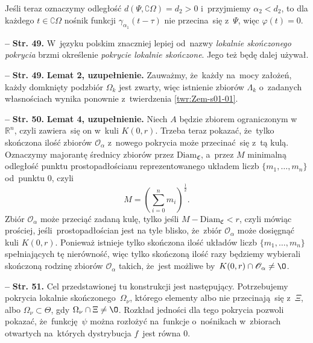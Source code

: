 \documentclass[a4paper,11pt]{article}
\newcommand{\spaceThree}{0.5em}
\newcommand{\ld}{\ldots}
\newcommand{\fr}{\frac}
\newcommand{\mr}{\mathrm}
\newcommand{\mb}{\mathbb}
\newcommand{\mc}{\mathcal}
\newcommand{\mf}{\mathfrak}
\newcommand{\al}{\alpha}
\newcommand{\ga}{\gamma}
\newcommand{\La}{\Lambda}
\newcommand{\vp}{\varphi}
\newcommand{\Om}{\Omega}
\newcommand{\R}{\mb{R}}
\newcommand{\Rn}{\R^{ n }}
\newcommand{\Oc}{\mc{O}}
\newcommand{\subs}{\subset}
\newcommand{\com}{\complement}
\newcommand{\Sum}{\sum\limits}
\newcommand{\tb}{\textbf}
\newcommand{\noi}{\noindent}
\newcommand{\start}{\noi \tb{--} {}}
\newcommand{\Str}[1]{\tb{Str. #1.}}
\newcommand{\vpt}{\vp( t )}
\begin{document}
Jeśli teraz oznaczymy odległość $d( \Psi, \com \Om ) = d_{ 2 } > 0$
i~przyjmiemy $\al_{ 2 } < d_{ 2 }$, to dla każdego $t \in \com \Om$
nośnik funkcji $\ga_{ \al_{ 1 } }( t - \tau )$ nie przecina~się
z~$\Psi$, więc $\vpt = 0$.

\vspace{\spaceThree}


\start \Str{49} W~języku polskim znaczniej lepiej od~nazwy
\emph{lokalnie skończonego pokrycia} brzmi określenie \emph{pokrycie
  lokalnie skończone}. Jego też będę dalej używał.

\vspace{\spaceThree}


\start \Str{49} \tb{Lemat 2, uzupełnienie.} Zauważmy, że~każdy na~mocy
założeń, każdy domknięty podzbiór $\Om_{ k }$ jest zwarty, więc
istnienie zbiorów $\La_{ k }$ o~zadanych własnościach wynika ponownie
z~twierdzenia \eqref{twr:Zem-s01-01}.

\vspace{\spaceThree}


\start \Str{50} \tb{Lemat 4, uzupełnienie.} Niech $A$ będzie zbiorem
ograniczonym w~$\Rn$, czyli zawiera~się on w~kuli $K( 0, r )$. Trzeba
teraz pokazać, że~tylko skończona ilość zbiorów $\Oc_{ \al }$ z~nowego
pokrycia może przecinać~się z~tą kulą. Oznaczymy majorantę średnicy
zbiorów przez $\mr{Diam}_{ \mf{ C } }$, a~przez $M$ minimalną
odległość punktu prostopadłościanu reprezentowanego układem liczb
$\{ m_{ 1 }, \ld, m_{ n } \}$ od~punktu $0$, czyli
\begin{equation*}
  M = \left( \Sum_{ i = 0 }^{ n } m_{ i } \right)^{ \fr{ 1 }{ 2 } }.
\end{equation*}
Zbiór $\Oc_{ \al }$ może przeciąć zadaną kulę, tylko jeśli
$M - \mr{Diam}_{ \mf{C} } < r$, czyli mówiąc prościej,
jeśli~prostopadłościan jest na tyle blisko, że~zbiór $\Oc_{ \al }$
może dosięgnąć kuli $K( 0, r )$. Ponieważ istnieje tylko skończona
ilość układów liczb $\{ m_{ 1 }, \ld, m_{ n } \}$ spełniających tę
nierówność, więc tylko skończoną ilość razy będziemy wybierali
skończoną rodzinę zbiorów $\Oc_{ \al }$ takich, że~jest możliwe
by~$K( 0, r ) \cap \Oc_{ \al } \neq \O$.

\vspace{\spaceThree}


\start \Str{51} Cel przedstawionej tu konstrukcji jest następujący.
Potrzebujemy pokrycia lokalnie skończonego~$\Om_{ \nu }$, którego
elementy albo nie przecinają~się z~$\Xi$, albo
$\Om_{ \nu } \subs \Theta$, gdy $\Om_{ \nu } \cap \Xi \neq \O$.
Rozkład jedności dla tego pokrycia pozwoli pokazać, że~funkcję~$\psi$
można rozłożyć na~funkcje o~nośnikach w~zbiorach otwartych na~których
dystrybucja $f$~jest równa $0$.
\end{document}
